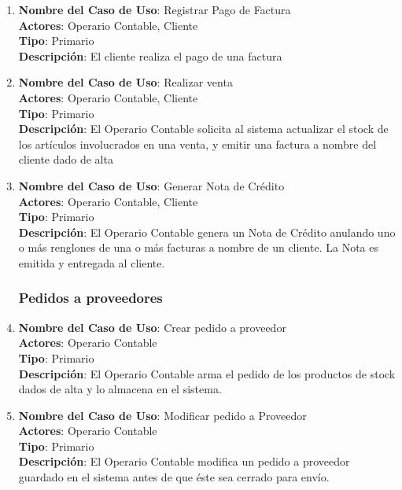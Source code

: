\documentclass[12pt]{extarticle}
\begin{document}
\begin{spacing}{1.2}
\begin{enumerate}
            \item 	\textbf{Nombre del Caso de Uso}: Registrar Pago de Factura\\
                    \textbf{Actores}: Operario Contable, Cliente\\
                    \textbf{Tipo}: Primario\\
                    \textbf{Descripción}: El cliente realiza el pago de una factura
            
            \item 	\textbf{Nombre del Caso de Uso}: Realizar venta\\
                    \textbf{Actores}: Operario Contable, Cliente\\
                    \textbf{Tipo}: Primario\\
                    \textbf{Descripción}: El Operario Contable solicita al sistema actualizar el stock de los artículos involucrados en una venta, y emitir una factura a nombre del cliente dado de alta

            \item 	\textbf{Nombre del Caso de Uso}: Generar Nota de Crédito\\
                    \textbf{Actores}: Operario Contable, Cliente\\
                    \textbf{Tipo}: Primario\\
                    \textbf{Descripción}: El Operario Contable genera un Nota de Crédito anulando uno o más renglones de una o más facturas a nombre de un cliente. La Nota es emitida y entregada al cliente.



            \subsubsection{Pedidos a proveedores}



            \item 	\textbf{Nombre del Caso de Uso}: Crear pedido a proveedor\\
                    \textbf{Actores}: Operario Contable\\
                    \textbf{Tipo}: Primario\\
                    \textbf{Descripción}: El Operario Contable arma el pedido de los productos de stock dados de alta y lo almacena en el sistema.

            \item 	\textbf{Nombre del Caso de Uso}: Modificar pedido a Proveedor\\
                    \textbf{Actores}: Operario Contable\\
                    \textbf{Tipo}: Primario\\
                    \textbf{Descripción}: El Operario Contable modifica un pedido a proveedor guardado en el sistema antes de que éste sea cerrado para envío.


\end{enumerate}
\end{spacing}
\end{document}
